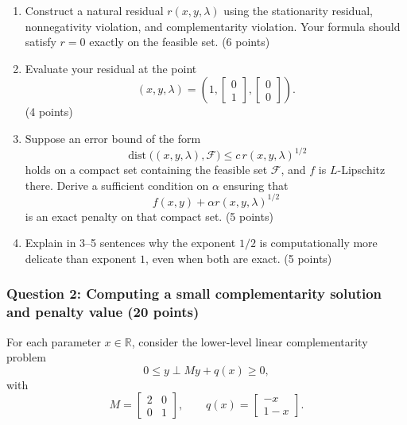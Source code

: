 \documentclass[pdflatex,sn-mathphys-num]{sn-jnl}%
\theoremstyle{definition}
\newcommand{\R}{\mathbb{R}}
\newcommand{\dist}{\operatorname{dist}}
\begin{document}
\begin{enumerate}[label=(\alph*)]
    \item Construct a natural residual \(r(x,y,\lambda)\) using the stationarity residual, nonnegativity violation, and complementarity violation. Your formula should satisfy \(r=0\) exactly on the feasible set. (6 points)

    \item Evaluate your residual at the point
    \[
    (x,y,\lambda)=\left(1,\begin{bmatrix}0\\1\end{bmatrix},\begin{bmatrix}0\\0\end{bmatrix}\right).
    \]
    (4 points)

    \item Suppose an error bound of the form
    \[
    \dist\bigl((x,y,\lambda),\mathcal F\bigr)\le c\,r(x,y,\lambda)^{1/2}
    \]
    holds on a compact set containing the feasible set \(\mathcal F\), and \(f\) is \(L\)-Lipschitz there.
    Derive a sufficient condition on \(\alpha\) ensuring that
    \[
    f(x,y)+\alpha r(x,y,\lambda)^{1/2}
    \]
    is an exact penalty on that compact set. (5 points)

    \item Explain in 3--5 sentences why the exponent \(1/2\) is computationally more delicate than exponent \(1\), even when both are exact. (5 points)
\end{enumerate}

\subsubsection*{Question 2: Computing a small complementarity solution and penalty value (20 points)}

For each parameter \(x\in\R\), consider the lower-level linear complementarity problem
\[
0\le y \perp My+q(x)\ge 0,
\]
with
\[
M=\begin{bmatrix}2&0\\0&1\end{bmatrix},
\qquad
q(x)=\begin{bmatrix}-x\\1-x\end{bmatrix}.
\]
\end{document}
